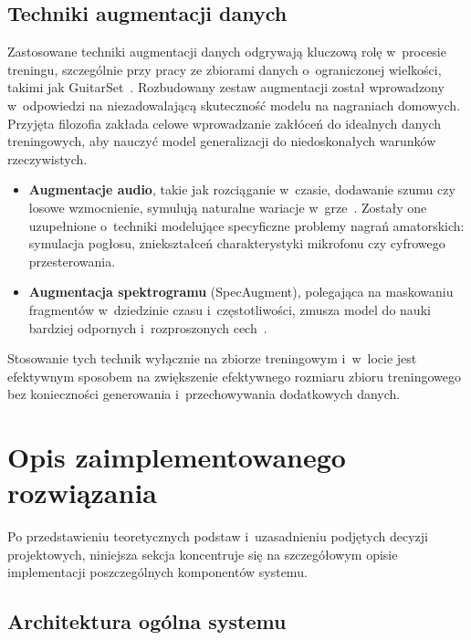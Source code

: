 \subsection{Techniki augmentacji danych}
\label{ssec:analiza_augmentacji_teoretyczna_fakt}

Zastosowane techniki augmentacji danych odgrywają kluczową rolę w~procesie treningu, szczególnie przy pracy ze zbiorami danych o~ograniczonej wielkości, takimi jak GuitarSet~\autocite{Wiggins2019TabCNN, Zang2023SynthTab}. Rozbudowany zestaw augmentacji został wprowadzony w~odpowiedzi na niezadowalającą skuteczność modelu na nagraniach domowych. Przyjęta filozofia zakłada celowe wprowadzanie zakłóceń do idealnych danych treningowych, aby nauczyć model generalizacji do niedoskonałych warunków rzeczywistych.
\begin{itemize}
    \item \textbf{Augmentacje audio}, takie jak rozciąganie w~czasie, dodawanie szumu czy losowe wzmocnienie, symulują naturalne wariacje w~grze~\autocite{Su2014SparseCepstral, KlapuriDavy2006SignalProcessing}. Zostały one uzupełnione o~techniki modelujące specyficzne problemy nagrań amatorskich: symulacja pogłosu, zniekształceń charakterystyki mikrofonu czy cyfrowego przesterowania.
    \item \textbf{Augmentacja spektrogramu} (SpecAugment), polegająca na maskowaniu fragmentów w~dziedzinie czasu i~częstotliwości, zmusza model do nauki bardziej odpornych i~rozproszonych cech~\autocite{Zang2023SynthTab, Park2019SpecAugment}.
\end{itemize}
Stosowanie tych technik wyłącznie na zbiorze treningowym i~w~locie jest efektywnym sposobem na zwiększenie efektywnego rozmiaru zbioru treningowego bez konieczności generowania i~przechowywania dodatkowych danych.

\section{Opis zaimplementowanego rozwiązania}
\label{sec:rozwiazanie_dyplomanta}

Po przedstawieniu teoretycznych podstaw i~uzasadnieniu podjętych decyzji projektowych, niniejsza sekcja koncentruje się na szczegółowym opisie implementacji poszczególnych komponentów systemu.


\subsection{Architektura ogólna systemu}
\label{ssec:architektura_ogolna}

